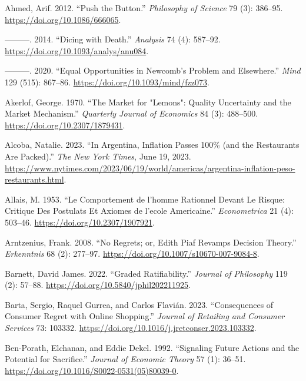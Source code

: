 \documentclass[
  12pt,
  letterpaper,
  DIV=11,
  numbers=noendperiod]{scrreprt}
\newlength{\cslhangindent}
\newenvironment{CSLReferences}[2] %
 {\begin{list}{}{%
  \setlength{\itemindent}{0pt}
  \setlength{\leftmargin}{0pt}
  \setlength{\parsep}{0pt}
  \ifodd #1
   \setlength{\leftmargin}{\cslhangindent}
   \setlength{\itemindent}{-1\cslhangindent}
  \fi
  \setlength{\itemsep}{#2\baselineskip}}}
 {\end{list}}
\begin{document}
\label{refs}
\begin{CSLReferences}{1}{0}
Ahmed, Arif. 2012. {``Push the Button.''} \emph{Philosophy of Science}
79 (3): 386--95. \url{https://doi.org/10.1086/666065}.

---------. 2014. {``Dicing with Death.''} \emph{Analysis} 74 (4):
587--92. \url{https://doi.org/10.1093/analys/anu084}.

---------. 2020. {``Equal Opportunities in Newcomb's Problem and
Elsewhere.''} \emph{Mind} 129 (515): 867--86.
\url{https://doi.org/10.1093/mind/fzz073}.

Akerlof, George. 1970. {``The Market for "Lemons": Quality Uncertainty
and the Market Mechanism.''} \emph{Quarterly Journal of Economics} 84
(3): 488--500. \url{https://doi.org/10.2307/1879431}.

Alcoba, Natalie. 2023. {``In Argentina, Inflation Passes 100\% (and the
Restaurants Are Packed).''} \emph{The New York Times}, June 19, 2023.
\url{https://www.nytimes.com/2023/06/19/world/americas/argentina-inflation-peso-restaurants.html}.

Allais, M. 1953. {``Le Comportement de l'homme Rationnel Devant Le
Risque: Critique Des Postulats Et Axiomes de l'ecole Americaine.''}
\emph{Econometrica} 21 (4): 503--46.
\url{https://doi.org/10.2307/1907921}.

Arntzenius, Frank. 2008. {``No Regrets; or, Edith Piaf Revamps Decision
Theory.''} \emph{Erkenntnis} 68 (2): 277--97.
\url{https://doi.org/10.1007/s10670-007-9084-8}.

Barnett, David James. 2022. {``Graded Ratifiability.''} \emph{Journal of
Philosophy} 119 (2): 57--88.
\url{https://doi.org/10.5840/jphil202211925}.

Barta, Sergio, Raquel Gurrea, and Carlos Flavián. 2023. {``Consequences
of Consumer Regret with Online Shopping.''} \emph{Journal of Retailing
and Consumer Services} 73: 103332.
\url{https://doi.org/10.1016/j.jretconser.2023.103332}.

Ben-Porath, Elchanan, and Eddie Dekel. 1992. {``Signaling Future Actions
and the Potential for Sacrifice.''} \emph{Journal of Economic Theory} 57
(1): 36--51. \url{https://doi.org/10.1016/S0022-0531(05)80039-0}.


\end{CSLReferences}
\end{document}

